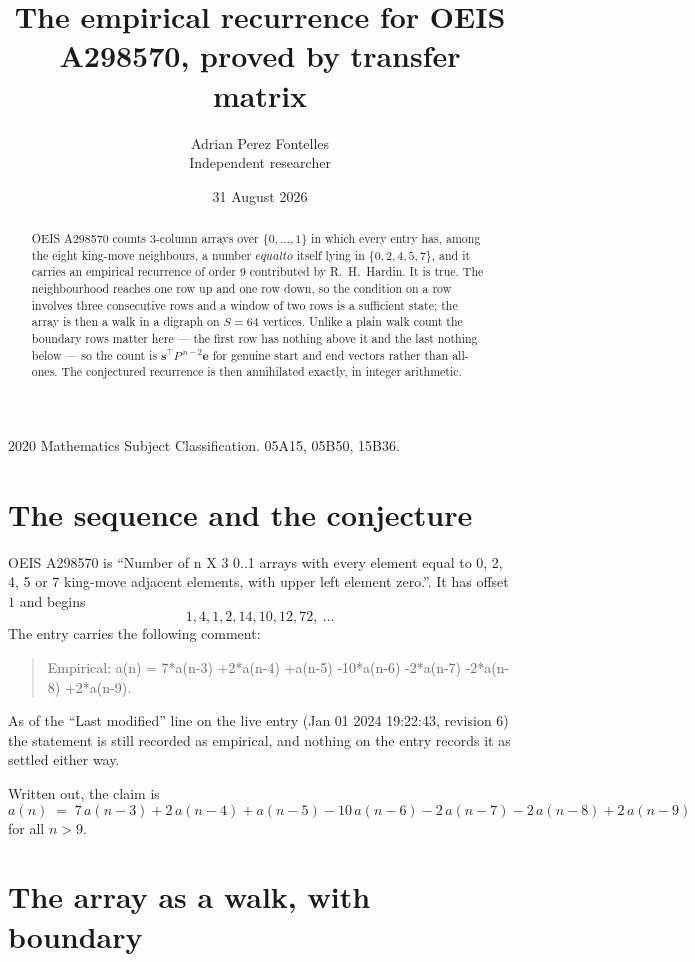 \documentclass[11pt,a4paper]{article}
\title{The empirical recurrence for OEIS A298570, proved by transfer matrix}
\author{Adrian Perez Fontelles\\ \small Independent researcher}
\date{31 August 2026}
\theoremstyle{plain}
\theoremstyle{definition}
\begin{document}
\maketitle

\begin{abstract}
OEIS A298570 counts $3$-column arrays over $\{0,\dots,1\}$ in which every entry has,
among the eight king-move neighbours, a number $equal to$ itself lying in $\{0,2,4,5,7\}$, and it carries an empirical
recurrence of order $9$ contributed by R.~H.~Hardin. It is true. The neighbourhood
reaches one row up and one row down, so the condition on a row involves three consecutive
rows and a window of two rows is a sufficient state; the array is then a walk in a digraph
on $S=64$ vertices. Unlike a plain walk count the boundary rows matter here --- the first
row has nothing above it and the last nothing below --- so the count is
$\mathbf{s}^{\!\top}P^{\,n-2}\mathbf{e}$ for genuine start and end vectors rather than
all-ones. The conjectured recurrence is then annihilated exactly, in integer arithmetic.
\end{abstract}

\noindent\small 2020 Mathematics Subject Classification. 05A15, 05B50, 15B36.\normalsize

\section{The sequence and the conjecture}

OEIS A298570 is ``Number of n X 3 0..1 arrays with every element equal to 0, 2, 4, 5 or 7 king-move adjacent elements, with upper left element zero.''. It has offset
$1$ and begins
\[
1, 4, 1, 2, 14, 10, 12, 72,\ \dots
\]
The entry carries the following comment:
\begin{quote}\small
Empirical: a(n) = 7*a(n-3) +2*a(n-4) +a(n-5) -10*a(n-6) -2*a(n-7) -2*a(n-8) +2*a(n-9).
\end{quote}
As of the ``Last modified'' line on the live entry (Jan 01 2024 19:22:43, revision
6) the statement is still recorded as empirical, and nothing on the entry
records it as settled either way.

Written out, the claim is
\begin{equation}\label{eq:conj}
a(n)\;=\;7\,a(n-3) + 2\,a(n-4) + a(n-5) - 10\,a(n-6) - 2\,a(n-7) - 2\,a(n-8) + 2\,a(n-9)
\end{equation}
for all $n>9$.

\section{The array as a walk, with boundary}
\end{document}
